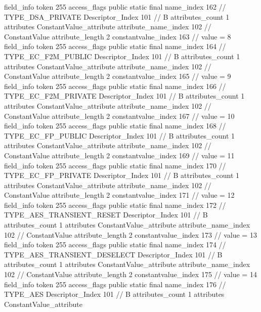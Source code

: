 {{{{{{{				}
				}
			}
			field_info {
				token	255
				access_flags	public static final
				name_index	162		// TYPE_DSA_PRIVATE
				Descriptor_Index	101		// B
				attributes_count	1
				attributes {
				ConstantValue_attribute {
					attribute_name_index	102		// ConstantValue
					attribute_length	2
					constantvalue_index	163		// value = 8
				}
				}
			}
			field_info {
				token	255
				access_flags	public static final
				name_index	164		// TYPE_EC_F2M_PUBLIC
				Descriptor_Index	101		// B
				attributes_count	1
				attributes {
				ConstantValue_attribute {
					attribute_name_index	102		// ConstantValue
					attribute_length	2
					constantvalue_index	165		// value = 9
				}
				}
			}
			field_info {
				token	255
				access_flags	public static final
				name_index	166		// TYPE_EC_F2M_PRIVATE
				Descriptor_Index	101		// B
				attributes_count	1
				attributes {
				ConstantValue_attribute {
					attribute_name_index	102		// ConstantValue
					attribute_length	2
					constantvalue_index	167		// value = 10
				}
				}
			}
			field_info {
				token	255
				access_flags	public static final
				name_index	168		// TYPE_EC_FP_PUBLIC
				Descriptor_Index	101		// B
				attributes_count	1
				attributes {
				ConstantValue_attribute {
					attribute_name_index	102		// ConstantValue
					attribute_length	2
					constantvalue_index	169		// value = 11
				}
				}
			}
			field_info {
				token	255
				access_flags	public static final
				name_index	170		// TYPE_EC_FP_PRIVATE
				Descriptor_Index	101		// B
				attributes_count	1
				attributes {
				ConstantValue_attribute {
					attribute_name_index	102		// ConstantValue
					attribute_length	2
					constantvalue_index	171		// value = 12
				}
				}
			}
			field_info {
				token	255
				access_flags	public static final
				name_index	172		// TYPE_AES_TRANSIENT_RESET
				Descriptor_Index	101		// B
				attributes_count	1
				attributes {
				ConstantValue_attribute {
					attribute_name_index	102		// ConstantValue
					attribute_length	2
					constantvalue_index	173		// value = 13
				}
				}
			}
			field_info {
				token	255
				access_flags	public static final
				name_index	174		// TYPE_AES_TRANSIENT_DESELECT
				Descriptor_Index	101		// B
				attributes_count	1
				attributes {
				ConstantValue_attribute {
					attribute_name_index	102		// ConstantValue
					attribute_length	2
					constantvalue_index	175		// value = 14
				}
				}
			}
			field_info {
				token	255
				access_flags	public static final
				name_index	176		// TYPE_AES
				Descriptor_Index	101		// B
				attributes_count	1
				attributes {
				ConstantValue_attribute {
}}}}}}}
